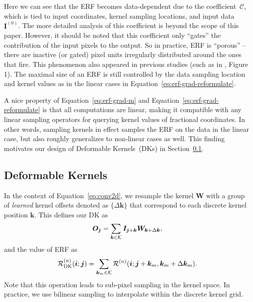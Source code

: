 \documentclass{article} \usepackage{iclr2020_conference, times}
\def\vi{{\bm{i}}}
\def\vj{{\bm{j}}}
\def\vk{{\bm{k}}}
\def\mI{{\bm{I}}}
\def\mO{{\bm{O}}}
\def\mW{{\bm{W}}}
\def\gC{{\mathcal{C}}}
\def\gK{{\mathcal{K}}}
\def\gR{{\mathcal{R}}}
\begin{document}
Here we can see that the ERF becomes data-dependent due to the coefficient~$\gC$,
which is tied to input coordinates, kernel sampling locations, and input
data~$\mI^{(0)}$.
The more detailed analysis of this coefficient is beyond the scope of
this paper.
However, it should be noted that this coefficient only ``gates'' the
contribution of the input pixels to the output.
So in practice, ERF is ``porous'' -- there are inactive (or gated) pixel units
irregularly distributed around the ones that fire.
This phenomenon also appeared in previous studies (such as in
\citet{luo2016understanding}, Figure 1).
The maximal size of an ERF is still controlled by the data sampling location and
kernel values as in the linear cases in Equation~\ref{eq:erf-grad-reformulate}.

A nice property of Equation~\ref{eq:erf-grad-m} and
Equation~\ref{eq:erf-grad-reformulate} is that all computations are
linear, making it compatible with any linear sampling operators for querying
kernel values of fractional coordinates.
In other words, sampling kernels in effect samples the ERF on the data in the
linear case, but also roughly generalizes to non-linear cases as well.
This finding motivates our design of Deformable Kernels~(DKs) in
Section~\ref{sec:dk}.


\subsection{Deformable Kernels} \label{sec:dk}

In the context of Equation~\ref{eq:conv2d}, we resample the kernel
$\mW$ with a group of \textit{learned} kernel offsets denoted as $\{\Delta
\vk\}$ that correspond to each discrete kernel position $\vk$.
This defines our DK as
\begin{equation}
\small
    \label{eq:dk2d}
    \mO_{\vj} =
    \sum_{\vk \in \gK} \mI_{\vj + \vk} \mW_{\vk + \Delta \vk},
\end{equation}
and the value of ERF as
\begin{equation}
\small
    \label{eq:erf-grad-dk}
    \gR^{(n)}_{\text{DK}}(\vi; \vj)
    =
    \sum_{\vk_{m} \in \gK}
    \gR^{(n)}(\vi; \vj + \vk_m, \vk_m + \Delta \vk_m).
\end{equation}
Note that this operation leads to sub-pixel sampling in the kernel space.
In practice, we use bilinear sampling to interpolate within the discrete kernel
grid.
\end{document}
